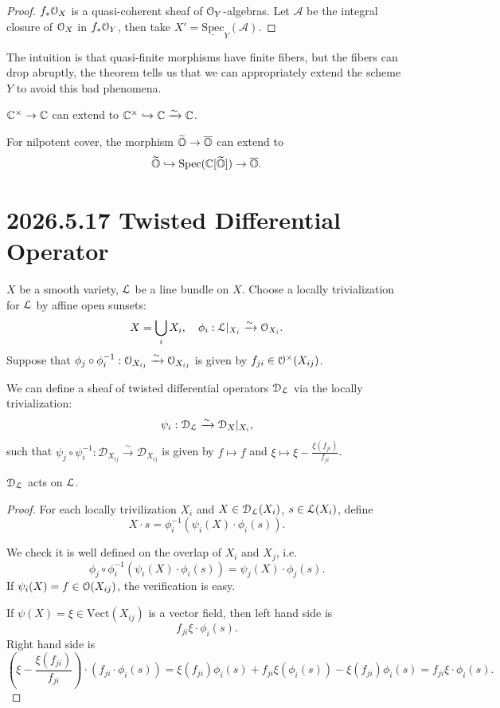 \documentclass[12pt]{amsart}
\numberwithin{equation}{section}
\newcommand{\CA}{{\mathcal {A}}} \newcommand{\CB}{{\mathcal {B}}} \newcommand{\CC}{{\mathcal {C}}}
\newcommand{\Spec}{\mathrm{Spec}}
\renewcommand{\bar}{\overline}
\renewcommand{\tilde}{\widetilde}
\begin{document}
\begin{proof}
  $f_*{\mathcal {O}}_X$ is a quasi-coherent sheaf of ${\mathcal {O}}_Y$-algebras. Let $\CA$ be the integral closure of ${\mathcal {O}}_X$ in $f_*{\mathcal {O}}_Y$, then take $X' = \underline{\Spec}_Y(\CA)$.
\end{proof}

The intuition is that quasi-finite morphisms have finite fibers, but the fibers can drop abruptly, the theorem tells us that we can appropriately extend the scheme $Y$ to avoid this bad phenomena.

\begin{examp}
  ${\mathbb {C}}^{\times} \to {\mathbb {C}}$ can extend to ${\mathbb {C}}^{\times} \hookrightarrow {\mathbb {C}} \xrightarrow{\sim} {\mathbb {C}}$. 
\end{examp}

\begin{examp}
  For nilpotent cover, the morphism $\tilde{\BO} \to \bar{\BO}$ can extend to 
  $$\tilde{\BO} \hookrightarrow \Spec(\BC[\tilde{\BO}]) \to \bar{\BO}.$$
\end{examp}


\section{2026.5.17 Twisted Differential Operator}

$X$ be a smooth variety, ${\mathcal {L}}$ be a line bundle on $X$. Choose a locally trivialization for ${\mathcal {L}}$ by affine open sunsets: 
\[
  X = \bigcup_{i} X_i, \quad \phi_i: {\mathcal {L}}|_{X_i} \xrightarrow{\sim} {\mathcal {O}}_{X_i}. 
\] 
Suppose that $\phi_j \circ \phi_i^{-1} : {\mathcal {O}}_{X_{ij}} \xrightarrow{\sim} {\mathcal {O}}_{X_{ij}}$ is given by $f_{ji} \in {\mathcal {O}}^{\times}(X_{ij})$.

We can define a sheaf of twisted differential operators $\mathcal{D}_{{\mathcal {L}}}$ via the locally trivialization:
\[
  \psi_i: \mathcal{D}_{{\mathcal {L}}} \xrightarrow{\sim} \mathcal{D}_X|_{X_i}, 
\]
such that $\psi_j \circ \psi_i^{-1}: \mathcal{D}_{X_{ij}} \xrightarrow{\sim} \mathcal{D}_{X_{ij}}$ is given by $f \mapsto f$ and $\xi \mapsto \xi - \frac{\xi(f_{ji})}{f_{ji}}$.

\begin{thm}
  $\mathcal{D}_{{\mathcal {L}}}$ acts on ${\mathcal {L}}$.
\end{thm}

\begin{proof}
  For each locally trivilization $X_i$ and $X \in \mathcal{D}_{{\mathcal {L}}}(X_i)$, $s \in {\mathcal {L}}(X_i)$,  define 
  \[X \cdot s = \phi_i^{-1}(\psi_i(X) \cdot \phi_i(s)).\] 

  We check it is well defined on the overlap of $X_i$ and $X_j$, i.e. 
  \[
    \phi_j \circ \phi_i^{-1} (\psi_i(X) \cdot \phi_i(s))  = \psi_j(X) \cdot \phi_j(s). 
  \]
  If $\psi_i(X) = f \in {\mathcal {O}}(X_{ij})$, the verification is easy.
  
  If $\psi(X) = \xi \in \mathrm{Vect}(X_{ij})$ is a vector field, then left hand side is
  \[
    f_{ji} \xi \cdot \phi_i(s).
  \]
  Right hand side is
  \[
    (\xi - \frac{\xi(f_{ji})}{f_{ji}}) \cdot (f_{ji} \cdot \phi_i(s)) = \xi(f_{ji})\phi_i(s) + f_{ji} \xi(\phi_i(s)) - \xi(f_{ji})\phi_i(s) = f_{ji}\xi \cdot \phi_i(s).  
  \]
  
\end{proof}
\end{document}
